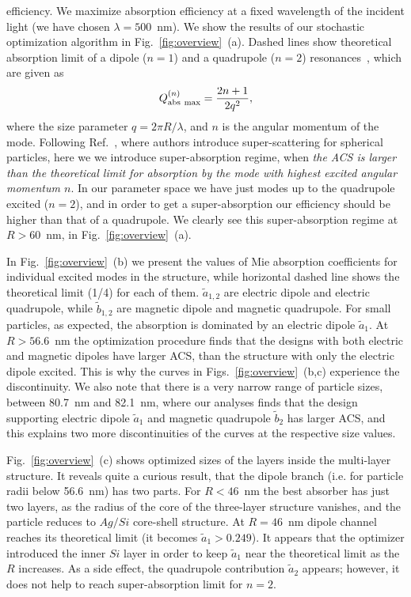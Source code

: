 \documentclass[aps,prl,twocolumn,showpacs,superscriptaddress,groupedaddress]{revtex4-1}
\begin{document}
efficiency. We maximize absorption efficiency at a fixed wavelength
of the incident light (we have chosen $\lambda=500$~nm). We show the results of our stochastic optimization
algorithm in Fig.~\ref{fig:overview}~(a).  Dashed lines show
theoretical absorption limit of a dipole ($n=1$) and a quadrupole
($n=2$) resonances~\cite{Tribelsky-2011}, which are given
as $$Q^{(n)}_{\rm abs\ max}=\frac{2n+1}{2q^2},$$ where the size
parameter $q=2\pi R/\lambda$, and $n$ is the angular momentum of the
mode. Following Ref.~\cite{Fan-2011}, where authors introduce
super-scattering for spherical particles, here we we introduce
super-absorption regime, when {\em the ACS is larger than the theoretical limit
for absorption by the mode with highest excited angular momentum
$n$}. In our parameter space we have just modes up to the quadrupole
excited ($n=2$), and in order to get a super-absorption our efficiency
should be higher than that of a quadrupole. We clearly see this
super-absorption regime at $R>60$~nm, in Fig.~\ref{fig:overview}~(a).

In Fig.~\ref{fig:overview}~(b) we present the values of Mie absorption
coefficients for individual excited modes in the structure, while
horizontal dashed line shows the theoretical limit (1/4) for each of
them. $\tilde{a}_{1,2}$ are electric dipole and electric quadrupole,
while $\tilde{b}_{1,2}$ are magnetic dipole and magnetic
quadrupole. For small particles, as expected, the absorption is
dominated by an electric dipole $\tilde{a}_1$.  At $R > 56.6$~nm the
optimization procedure finds that the designs with both electric and
magnetic dipoles have larger ACS, than the structure with only the
electric dipole excited. This is why the curves in
Figs.~\ref{fig:overview}~(b,c) experience the discontinuity. We also
note that there is a very narrow range of particle sizes, between
80.7~nm and 82.1~nm, where our analyses finds that the design
supporting electric dipole $\tilde{a}_1$ and magnetic quadrupole
$\tilde{b}_2$ has larger ACS, and this explains two more
discontinuities of the curves at the respective size values.

Fig.~\ref{fig:overview}~(c) shows optimized sizes of the layers inside
the multi-layer structure. It reveals quite a curious result, that the
dipole branch (i.e. for particle radii below 56.6~nm) has two
parts. For $R<46$~nm the best absorber has just two layers, as the
radius of the core of the three-layer structure vanishes, and the
particle reduces to $Ag/Si$ core-shell structure.  At $R=46$~nm dipole
channel reaches its theoretical limit (it becomes
$\tilde{a}_1>0.249$).  It appears that the optimizer introduced the
inner $Si$ layer in order to keep $\tilde{a}_1$ near the theoretical
limit as the $R$ increases.  As a side effect, the quadrupole
contribution $\tilde{a}_2$ appears; however, it does not help to reach
super-absorption limit for $n=2$.
\end{document}
